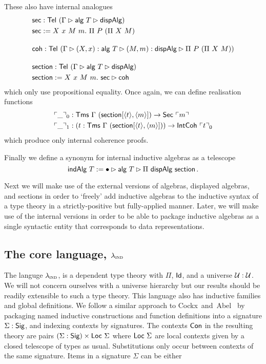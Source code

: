 These also have internal analogues
\begin{align*}
    &\textsf{sec} : \textsf{Tel}\ (\Gamma \rhd \textsf{alg}\ T \rhd \textsf{dispAlg}) \\
    &\textsf{sec} := X\ x\ M\ m.\ \Pi\ P\ (\Pi\ X\ M) \\[1em]
    &\textsf{coh} : \textsf{Tel}\ (\Gamma \rhd (X, x) : \textsf{alg}\ T\rhd (M, m) : \textsf{dispAlg} \rhd \Pi\ P\ (\Pi\ X\ M)) \\[1em]
    &\textsf{section} : \textsf{Tel}\ (\Gamma \rhd \textsf{alg}\ T \rhd \textsf{dispAlg}) \\
    &\textsf{section} := X\ x\ M\ m.\ \textsf{sec} \rhd \textsf{coh}
\end{align*}
which only use propositional equality.
Once again, we can define realisation functions
\begin{align*}
    &\emb{\_}_0 : \Tms\ \Gamma\ (\mta{section}[\Msub{t},\Msub{m}]) \to \mta{Sec}\ \emb{m} \\
    &\emb{\_}_1 : (t : \Tms\ \Gamma\ (\mta{section}[\Msub{t},\Msub{m}])) \to \mta{IntCoh}\ \emb{t}_0
\end{align*}
which produce only internal coherence proofs.

Finally we define a synonym for internal inductive algebras as a telescope
\[
    \textsf{indAlg}\ T := \bullet \rhd \textsf{alg}\ T \rhd \Pi\ \textsf{dispAlg}\ \textsf{section} \,.
\]

Next we will make use of the external versions of algebras, displayed algebras,
and sections in order to `freely' add inductive algebras to the inductive syntax
of a type theory in a strictly-positive but fully-applied manner. Later, we will
make use of the internal versions in order to be able to package inductive
algebras as a single syntactic entity that corresponds to data
representations.

\subsection{The core language, $\lambda_{\textsc{ind}}$}\label{sub:lambdaind}

The languge $\lambda_{\textsc{ind}}$, is a dependent type theory with $\Pi$, $\textsf{Id}$, and
a universe $\mathcal{U} : \mathcal{U}$. We will not concern ourselves with a universe
hierarchy but our results should be readily extensible to such a type theory.
This language also has inductive families and global definitions. We follow a
similar approach
to Cockx~and~Abel~\cite{Cockx2018-fk} by packaging named inductive constructions
and function definitions into a signature $\Sigma : \textsf{Sig}$, and indexing contexts
by signatures. The contexts $\textsf{Con}$ in the resulting theory are pairs $(\Sigma :
\textsf{Sig}) \times \textsf{Loc}\ \Sigma$ where $\Loc\ \Sigma$ are local contexts given by a
closed telescope of types as usual. Substitutions only occur between contexts of
the same signature. Items in a signature $\Sigma$ can be either

